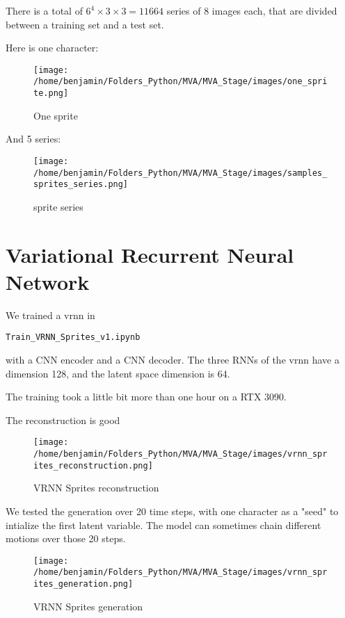 There is a total of $6^4 \times 3 \times 3 = 11664$ series of 8 images each, that are divided between a training set and a 
test set.

Here is one character:
\begin{figure}[H]
    \centering
    \texttt{[image: /home/benjamin/Folders\_Python/MVA/MVA\_Stage/images/one\_sprite.png]}
    \caption{One sprite}
    \label{fig:One sprite}
\end{figure}

And 5 series:
\begin{figure}[H]
    \centering
    \texttt{[image: /home/benjamin/Folders\_Python/MVA/MVA\_Stage/images/samples\_sprites\_series.png]}
    \caption{sprite series}
    \label{fig:sprite series}
\end{figure}

\section{Variational Recurrent Neural Network}

We trained a \gls{vrnn} in
\begin{verbatim}
Train_VRNN_Sprites_v1.ipynb
\end{verbatim}
with a CNN encoder and a CNN decoder. 
The three RNNs of the \gls{vrnn} have a dimension 128, and the latent space dimension is 64.

The training took a little bit more than one hour on a RTX 3090.

The reconstruction is good

\begin{figure}[H]
    \centering
    \texttt{[image: /home/benjamin/Folders\_Python/MVA/MVA\_Stage/images/vrnn\_sprites\_reconstruction.png]}
    \caption{VRNN Sprites reconstruction}
    \label{fig:VRNN Sprites reconstruction}
\end{figure}

\newpage
\begin{landscape}
We tested the generation over 20 time steps, with one character as a "seed" to intialize the first latent variable. The model 
can sometimes chain different motions over those 20 steps.

\begin{figure}[H]
    \centering
    \texttt{[image: /home/benjamin/Folders\_Python/MVA/MVA\_Stage/images/vrnn\_sprites\_generation.png]}
    \caption{VRNN Sprites generation}
    \label{fig:sprite generation}
\end{figure}
\end{landscape}


